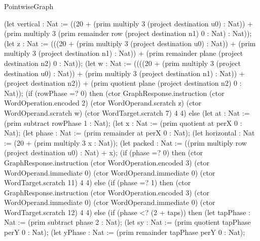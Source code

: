 \begin{lexlean}{PointwiseGraph}
\begin{semanticmodule}
{      (let vertical : Nat := ((20 + (prim multiply 3 (project destination u0) : Nat)) + (prim multiply 3 (prim remainder row (project destination n1) 0 : Nat) : Nat));
      (let z : Nat := (((20 + (prim multiply 3 (project destination u0) : Nat)) + (prim multiply 3 (project destination n1) : Nat)) + (prim remainder plane (project destination n2) 0 : Nat));
      (let w : Nat := ((((20 + (prim multiply 3 (project destination u0) : Nat)) + (prim multiply 3 (project destination n1) : Nat)) + (project destination n2)) + (prim quotient plane (project destination n2) 0 : Nat));
      (if (rowPhase =? 0) then (ctor GraphResponse.instruction (ctor WordOperation.encoded 2) (ctor WordOperand.scratch z) (ctor WordOperand.scratch w) (ctor WordTarget.scratch 7) 4 4) else (let at : Nat := (prim subtract rowPhase 1 : Nat);
      (let x : Nat := (prim quotient at perX 0 : Nat);
      (let phase : Nat := (prim remainder at perX 0 : Nat);
      (let horizontal : Nat := (20 + (prim multiply 3 x : Nat));
      (let packed : Nat := ((prim multiply row (project destination u0) : Nat) + x);
      (if (phase =? 0) then (ctor GraphResponse.instruction (ctor WordOperation.encoded 3) (ctor WordOperand.immediate 0) (ctor WordOperand.immediate 0) (ctor WordTarget.scratch 11) 4 4) else (if (phase =? 1) then (ctor GraphResponse.instruction (ctor WordOperation.encoded 3) (ctor WordOperand.immediate 0) (ctor WordOperand.immediate 0) (ctor WordTarget.scratch 12) 4 4) else (if (phase <? (2 + taps)) then (let tapPhase : Nat := (prim subtract phase 2 : Nat);
      (let sy : Nat := (prim quotient tapPhase perY 0 : Nat);
      (let yPhase : Nat := (prim remainder tapPhase perY 0 : Nat);
}
\end{semanticmodule}
\end{lexlean}

